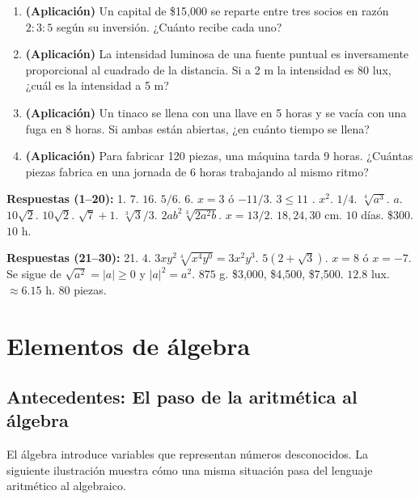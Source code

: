 \documentclass[12pt,letterpaper]{book}
\begin{document}
\begin{enumerate}
\item \textbf{(Aplicación)} Un capital de \$15{,}000 se reparte entre tres socios en razón $2:3:5$ según su inversión. ¿Cuánto recibe cada uno?
\item \textbf{(Aplicación)} La intensidad luminosa de una fuente puntual es inversamente proporcional al cuadrado de la distancia. Si a 2 m la intensidad es 80 lux, ¿cuál es la intensidad a 5 m?
\item \textbf{(Aplicación)} Un tinaco se llena con una llave en 5 horas y se vacía con una fuga en 8 horas. Si ambas están abiertas, ¿en cuánto tiempo se llena?
\item \textbf{(Aplicación)} Para fabricar 120 piezas, una máquina tarda 9 horas. ¿Cuántas piezas fabrica en una jornada de 6 horas trabajando al mismo ritmo?
\end{enumerate}

\textbf{Respuestas (1--20):} 1. $7$. $16$. $5/6$. $6$. $x=3$ ó $-11/3$. $3\leq11$ \checkmark{}. $x^2$. $1/4$. $\sqrt[4]{a^3}$. $a$. $10\sqrt2$. $10\sqrt2$. $\sqrt7+1$. $\sqrt[3]{3}/3$. $2ab^2\sqrt[3]{2a^2b}$. $x=13/2$. $18,24,30$ cm. $10$ días. \$300. $10$ h.

\textbf{Respuestas (21--30):} 21. $4$. $3xy^2\sqrt[4]{x^4y^0}=3x^2y^3$. $5(2+\sqrt3)$. $x=8$ ó $x=-7$. Se sigue de $\sqrt{a^2}=|a|\geq0$ y $|a|^2=a^2$. $875$ g. \$3{,}000, \$4{,}500, \$7{,}500. $12.8$ lux. $\approx6.15$ h. $80$ piezas.

\chapter{Elementos de álgebra}

\section*{Antecedentes: El paso de la aritmética al álgebra}

El álgebra introduce variables que representan números desconocidos. La siguiente
ilustración muestra cómo una misma situación pasa del lenguaje aritmético al algebraico.
\end{document}
